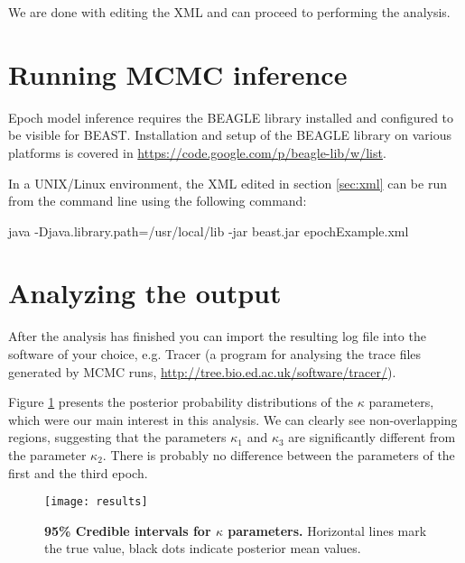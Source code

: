 We are done with editing the XML and can proceed to performing the analysis.

\section{Running MCMC inference}

Epoch model inference requires the BEAGLE library installed and configured to be visible for BEAST.
Installation and setup of the BEAGLE library on various platforms is covered in \url{https://code.google.com/p/beagle-lib/w/list}.

In a UNIX/Linux environment, the XML edited in section \ref{sec:xml} can be run from the command line using the following command:

\begin{code}
java -Djava.library.path=/usr/local/lib -jar beast.jar epochExample.xml
\end{code}


\section{Analyzing the output}

After the analysis has finished you can import the resulting log file into the software of your choice, e.g. Tracer (a program for analysing the trace files generated by MCMC runs, \url{http://tree.bio.ed.ac.uk/software/tracer/}).

Figure \ref{fig:results} presents the posterior probability distributions of the $\kappa$ parameters, which were our main interest in this analysis. 
We can clearly see non-overlapping regions, suggesting that the parameters $\kappa_1$ and $\kappa_3$ are significantly different from the parameter $\kappa_2$.
There is probably no difference between the parameters of the first and the third epoch.

\begin{figure}[H]
\centering
\texttt{[image: results]} 
\caption{
{ \footnotesize 
{\bf 95\% Credible intervals for $\kappa$ parameters.} Horizontal lines mark the true value, black dots indicate posterior mean values.
} %
}
\label{fig:results}
\end{figure}












% 
